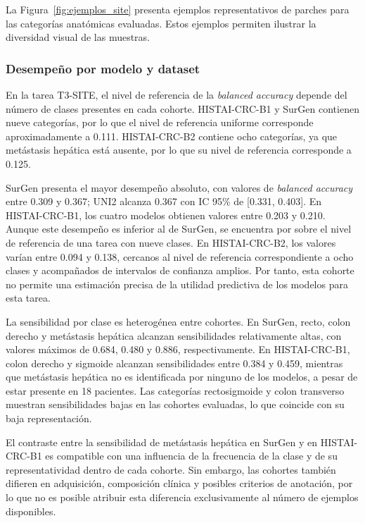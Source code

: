 La Figura~\ref{fig:ejemplos_site} presenta ejemplos representativos de parches para las categorías anatómicas evaluadas. Estos ejemplos permiten ilustrar la diversidad visual de las muestras.

\subsubsection{Desempeño por modelo y dataset}

En la tarea T3-SITE, el nivel de referencia de la \textit{balanced accuracy} depende del número de clases presentes en cada cohorte. HISTAI-CRC-B1 y SurGen contienen nueve categorías, por lo que el nivel de referencia uniforme corresponde aproximadamente a 0.111. HISTAI-CRC-B2 contiene ocho categorías, ya que metástasis hepática está ausente, por lo que su nivel de referencia corresponde a 0.125.

SurGen presenta el mayor desempeño absoluto, con valores de \textit{balanced accuracy} entre 0.309 y 0.367; UNI2 alcanza 0.367 con IC 95\% de [0.331, 0.403]. En HISTAI-CRC-B1, los cuatro modelos obtienen valores entre 0.203 y 0.210. Aunque este desempeño es inferior al de SurGen, se encuentra por sobre el nivel de referencia de una tarea con nueve clases. En HISTAI-CRC-B2, los valores varían entre 0.094 y 0.138, cercanos al nivel de referencia correspondiente a ocho clases y acompañados de intervalos de confianza amplios. Por tanto, esta cohorte no permite una estimación precisa de la utilidad predictiva de los modelos para esta tarea.

La sensibilidad por clase es heterogénea entre cohortes. En SurGen, recto, colon derecho y metástasis hepática alcanzan sensibilidades relativamente altas, con valores máximos de 0.684, 0.480 y 0.886, respectivamente. En HISTAI-CRC-B1, colon derecho y sigmoide alcanzan sensibilidades entre 0.384 y 0.459, mientras que metástasis hepática no es identificada por ninguno de los modelos, a pesar de estar presente en 18 pacientes. Las categorías rectosigmoide y colon transverso muestran sensibilidades bajas en las cohortes evaluadas, lo que coincide con su baja representación.

El contraste entre la sensibilidad de metástasis hepática en SurGen y en HISTAI-CRC-B1 es compatible con una influencia de la frecuencia de la clase y de su representatividad dentro de cada cohorte. Sin embargo, las cohortes también difieren en adquisición, composición clínica y posibles criterios de anotación, por lo que no es posible atribuir esta diferencia exclusivamente al número de ejemplos disponibles.

